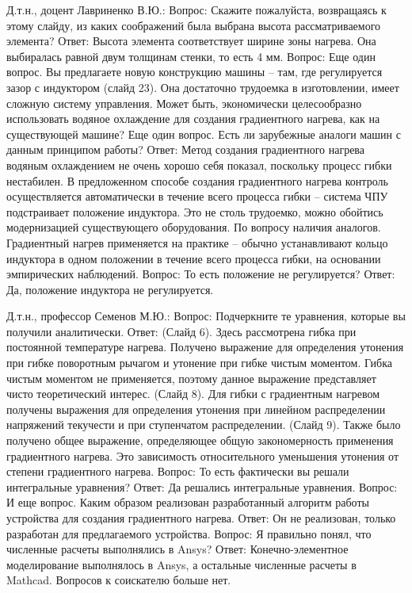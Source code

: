 Д.т.н., доцент Лавриненко В.Ю.:
Вопрос: Скажите пожалуйста, возвращаясь к этому слайду, из каких соображений была выбрана высота рассматриваемого элемента?
Ответ: Высота элемента соответствует ширине зоны нагрева. Она выбиралась равной двум толщинам стенки, то есть 4 мм.
Вопрос: Еще один вопрос. Вы предлагаете новую конструкцию машины – там, где регулируется зазор с индуктором (слайд 23). Она достаточно трудоемка в изготовлении, имеет сложную систему управления. Может быть, экономически целесообразно использовать водяное охлаждение для создания градиентного нагрева, как на существующей машине? Еще один вопрос. Есть ли зарубежные аналоги машин с данным принципом работы?
Ответ: Метод создания градиентного нагрева водяным охлаждением не очень хорошо себя показал, поскольку процесс гибки нестабилен. В предложенном способе создания градиентного нагрева контроль осуществляется автоматически в течение всего процесса гибки – система ЧПУ подстраивает положение индуктора. Это не столь трудоемко, можно обойтись модернизацией существующего оборудования. По вопросу наличия аналогов. Градиентный нагрев применяется на практике – обычно устанавливают кольцо индуктора в одном положении в течение всего процесса гибки, на основании эмпирических наблюдений.
Вопрос: То есть положение не регулируется?
Ответ: Да, положение индуктора не регулируется.

Д.т.н., профессор Семенов М.Ю.:
Вопрос: Подчеркните те уравнения, которые вы получили аналитически.
Ответ: (Слайд 6). Здесь рассмотрена гибка при постоянной температуре нагрева. Получено выражение для определения утонения при гибке поворотным рычагом и утонение при гибке чистым моментом. Гибка чистым моментом не применяется, поэтому данное выражение представляет чисто теоретический интерес. (Слайд 8). Для гибки с градиентным нагревом получены выражения для определения утонения при линейном распределении напряжений текучести и при ступенчатом распределении. (Слайд 9). Также было получено общее выражение, определяющее общую закономерность применения градиентного нагрева. Это зависимость относительного уменьшения утонения от степени градиентного нагрева. 
Вопрос: То есть фактически вы решали интегральные уравнения?
Ответ: Да решались интегральные уравнения.
Вопрос: И еще вопрос. Каким образом реализован разработанный алгоритм работы устройства для создания градиентного нагрева.
Ответ: Он не реализован, только разработан для предлагаемого устройства.
Вопрос: Я правильно понял, что численные расчеты выполнялись в Ansys?
Ответ: Конечно-элементное моделирование выполнялось в Ansys, а остальные численные расчеты в Mathcad.
Вопросов к соискателю больше нет.

